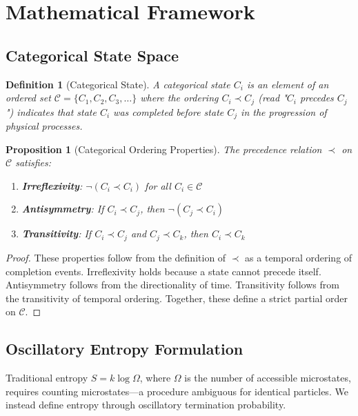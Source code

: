 \documentclass[12pt,a4paper]{article}
\newtheorem{definition}[theorem]{Definition}
\newtheorem{proposition}[theorem]{Proposition}
\theoremstyle{remark}
\begin{document}
\section{Mathematical Framework}

\subsection{Categorical State Space}

\begin{definition}[Categorical State]
A categorical state $C_i$ is an element of an ordered set $\mathcal{C} = \{C_1, C_2, C_3, \ldots\}$ where the ordering $C_i \prec C_j$ (read "$C_i$ precedes $C_j$") indicates that state $C_i$ was completed before state $C_j$ in the progression of physical processes.
\end{definition}

\begin{proposition}[Categorical Ordering Properties]
The precedence relation $\prec$ on $\mathcal{C}$ satisfies:
\begin{enumerate}
\item \textbf{Irreflexivity}: $\neg(C_i \prec C_i)$ for all $C_i \in \mathcal{C}$
\item \textbf{Antisymmetry}: If $C_i \prec C_j$, then $\neg(C_j \prec C_i)$
\item \textbf{Transitivity}: If $C_i \prec C_j$ and $C_j \prec C_k$, then $C_i \prec C_k$
\end{enumerate}
\end{proposition}

\begin{proof}
These properties follow from the definition of $\prec$ as a temporal ordering of completion events. Irreflexivity holds because a state cannot precede itself. Antisymmetry follows from the directionality of time. Transitivity follows from the transitivity of temporal ordering. Together, these define a strict partial order on $\mathcal{C}$.
\end{proof}

\subsection{Oscillatory Entropy Formulation}

Traditional entropy $S = k \log \Omega$, where $\Omega$ is the number of accessible microstates, requires counting microstates—a procedure ambiguous for identical particles. We instead define entropy through oscillatory termination probability.
\end{document}
